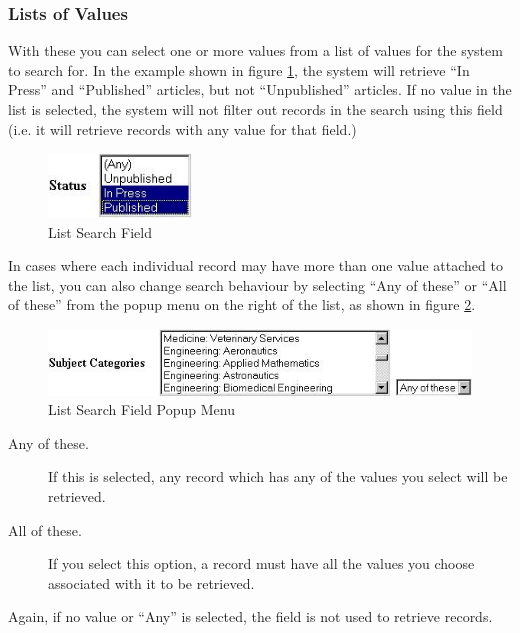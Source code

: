\subsubsection{Lists of Values}

With these you can select one or more values from a list of values for the system to search for. In the example shown in figure \ref{list_search_field}, the system will retrieve ``In Press'' and ``Published'' articles, but not ``Unpublished'' articles. If no value in the list is selected, the system will not filter out records in the search using this field (i.e. it will retrieve records with any value for that field.)

\begin{figure}
\centerline{\includegraphics[width=1.5in]{images/list-search-field}}
\caption{\label{list_search_field} List Search Field}
\end{figure}

In cases where each individual record may have more than one value attached to the list, you can also change search behaviour by selecting ``Any of these'' or ``All of these'' from the popup menu on the right of the list, as shown in figure \ref{list_search_anyall}.

\begin{figure}
\centerline{\includegraphics[width=4.5in]{images/list-search-anyall}}
\caption{\label{list_search_anyall} List Search Field Popup Menu}
\end{figure}

\begin{description}
\item[Any of these.] If this is selected, any record which has any of the values you select will be retrieved.
\item[All of these.] If you select this option, a record must have all the values you choose associated with it to be retrieved.
\end{description}

Again, if no value or ``Any'' is selected, the field is not used to retrieve records.


